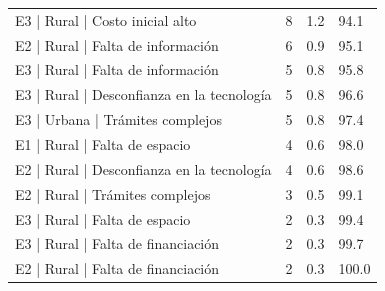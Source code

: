 {\begin{longtable}{@{}p{}lll@{}}
E3 | Rural | Costo inicial alto & 8 & 1.2 & 94.1 \\
E2 | Rural | Falta de información & 6 & 0.9 & 95.1 \\
E3 | Rural | Falta de información & 5 & 0.8 & 95.8 \\
E3 | Rural | Desconfianza en la tecnología & 5 & 0.8 & 96.6 \\
E3 | Urbana | Trámites complejos & 5 & 0.8 & 97.4 \\
E1 | Rural | Falta de espacio & 4 & 0.6 & 98.0 \\
E2 | Rural | Desconfianza en la tecnología & 4 & 0.6 & 98.6 \\
E2 | Rural | Trámites complejos & 3 & 0.5 & 99.1 \\
E3 | Rural | Falta de espacio & 2 & 0.3 & 99.4 \\
E3 | Rural | Falta de financiación & 2 & 0.3 & 99.7 \\
E2 | Rural | Falta de financiación & 2 & 0.3 & 100.0 \\
\bottomrule
\end{longtable}}
